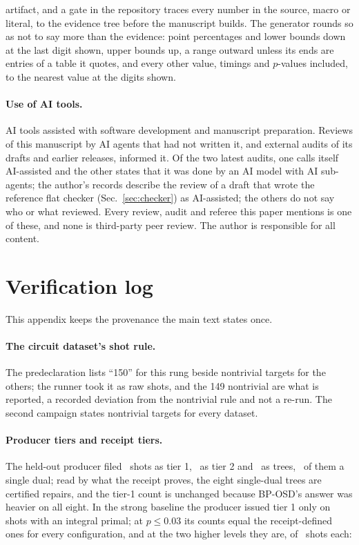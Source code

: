 \documentclass[aps,pra,twocolumn,superscriptaddress,nofootinbib,longbibliography,floatfix]{revtex4-2}
\begin{document}
artifact, and a gate in the repository traces every number in the source, macro or literal, to the evidence tree before the manuscript builds. The generator rounds so as not to say more than the evidence: point percentages and lower bounds down at the last digit shown, upper bounds up, a range outward unless its ends are entries of a table it quotes, and every other value, timings and $p$-values included, to the nearest value at the digits shown.

\paragraph*{Use of AI tools.} AI tools assisted with software development and manuscript preparation. Reviews of this manuscript by AI agents that had not written it, and external audits of its drafts and earlier releases, informed it. Of the two latest audits, one calls itself AI-assisted and the other states that it was done by an AI model with AI sub-agents; the author's records describe the review of a draft that wrote the reference flat checker (Sec.~\ref{sec:checker}) as AI-assisted; the others do not say who or what reviewed. Every review, audit and referee this paper mentions is one of these, and none is third-party peer review. The author is responsible for all content.

\appendix

\section{Verification log}
\label{app:log}

This appendix keeps the provenance the main text states once.

\paragraph*{The circuit dataset's shot rule.} The predeclaration lists ``150'' for this rung beside nontrivial targets for the others; the runner took it as raw shots, and the 149 nontrivial are what is reported, a recorded deviation from the nontrivial rule and not a re-run. The second campaign states nontrivial targets for every dataset.

\paragraph*{Producer tiers and receipt tiers.} The held-out producer filed \HoTierOne\ shots as tier 1, \HoTierTwo\ as tier 2 and \HoTrees\ as trees, \HoTreesOneNode\ of them a single dual; read by what the receipt proves, the eight single-dual trees are certified repairs, and the tier-1 count is unchanged because BP-OSD's answer was heavier on all eight. In the strong baseline the producer issued tier 1 only on shots with an integral primal; at $p\le 0.03$ its counts equal the receipt-defined ones for every configuration, and at the two higher levels they are, of \StrongShots\ shots each:
\begin{center}\small

\end{center}
\end{document}
